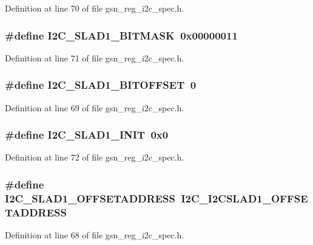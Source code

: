 Definition at line 70 of file gsn\_\-reg\_\-i2c\_\-spec.h.

\hypertarget{a00558_a8b67d75013594f5217ea239b66dba3e5}{
\subsubsection[{I2C\_\-SLAD1\_\-BITMASK}]{\setlength{\rightskip}{0pt plus 5cm}\#define I2C\_\-SLAD1\_\-BITMASK~0x00000011}}
\label{a00558_a8b67d75013594f5217ea239b66dba3e5}


Definition at line 71 of file gsn\_\-reg\_\-i2c\_\-spec.h.

\hypertarget{a00558_a930605870b0410b9281973215222dcf1}{
\subsubsection[{I2C\_\-SLAD1\_\-BITOFFSET}]{\setlength{\rightskip}{0pt plus 5cm}\#define I2C\_\-SLAD1\_\-BITOFFSET~0}}
\label{a00558_a930605870b0410b9281973215222dcf1}


Definition at line 69 of file gsn\_\-reg\_\-i2c\_\-spec.h.

\hypertarget{a00558_a3c0fafeb95e1ef3fa29f84ee802186da}{
\subsubsection[{I2C\_\-SLAD1\_\-INIT}]{\setlength{\rightskip}{0pt plus 5cm}\#define I2C\_\-SLAD1\_\-INIT~0x0}}
\label{a00558_a3c0fafeb95e1ef3fa29f84ee802186da}


Definition at line 72 of file gsn\_\-reg\_\-i2c\_\-spec.h.

\hypertarget{a00558_ab82ab6cd3ba1f49a8244ae11ab263222}{
\subsubsection[{I2C\_\-SLAD1\_\-OFFSETADDRESS}]{\setlength{\rightskip}{0pt plus 5cm}\#define I2C\_\-SLAD1\_\-OFFSETADDRESS~I2C\_\-I2CSLAD1\_\-OFFSETADDRESS}}
\label{a00558_ab82ab6cd3ba1f49a8244ae11ab263222}


Definition at line 68 of file gsn\_\-reg\_\-i2c\_\-spec.h.

